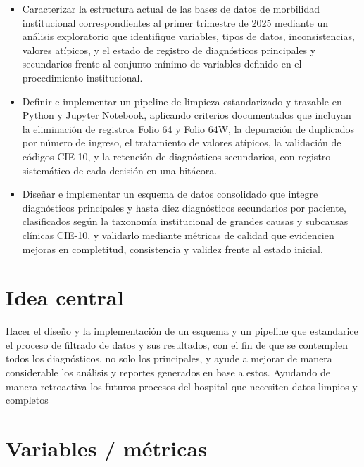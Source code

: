 \documentclass[12pt]{article}
\begin{document}
\begin{itemize}
    \item Caracterizar la estructura actual de las bases de datos de morbilidad institucional correspondientes al primer trimestre de 2025 mediante un análisis exploratorio que identifique variables, tipos de datos, inconsistencias, valores atípicos, y el estado de registro de diagnósticos principales y secundarios frente al conjunto mínimo de variables definido en el procedimiento institucional.
    
    \item Definir e implementar un pipeline de limpieza estandarizado y trazable en Python y Jupyter Notebook, aplicando criterios documentados que incluyan la eliminación de registros Folio 64 y Folio 64W, la depuración de duplicados por número de ingreso, el tratamiento de valores atípicos, la validación de códigos CIE-10, y la retención de diagnósticos secundarios, con registro sistemático de cada decisión en una bitácora.
    
    \item Diseñar e implementar un esquema de datos consolidado que integre diagnósticos principales y hasta diez diagnósticos secundarios por paciente, clasificados según la taxonomía institucional de grandes causas y subcausas clínicas CIE-10, y validarlo mediante métricas de calidad que evidencien mejoras en completitud, consistencia y validez frente al estado inicial.
\end{itemize}

\section*{Idea central}

Hacer el diseño y la implementación de un esquema y un pipeline que estandarice el proceso de filtrado de datos y sus resultados, con el fin de que se contemplen todos los diagnósticos, no solo los principales, y ayude a mejorar de manera considerable los análisis y reportes generados en base a estos. Ayudando de manera retroactiva los
futuros procesos del hospital que necesiten datos limpios y completos

\section*{Variables / métricas}
\end{document}
